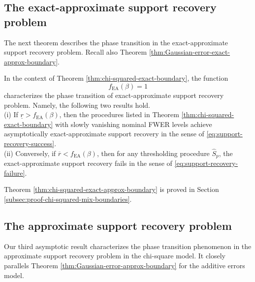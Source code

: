 \subsection{The exact-approximate support recovery problem}
\label{subsec:exact-approx-support-recovery-chisq}

The next theorem describes the phase transition in the exact-approximate support recovery problem. Recall also
Theorem \ref{thm:Gaussian-error-exact-approx-boundary}.

\begin{theorem} \label{thm:chi-squared-exact-approx-boundary}
In the context of Theorem \ref{thm:chi-squared-exact-boundary}, 
the function 
\begin{equation} \label{eq:exact-approx-boundary-chisquared}
    f_{\mathrm{EA}}(\beta) = 1
\end{equation}
characterizes the phase transition of exact-approximate support recovery problem.
 Namely, the following two results hold.\\

{\rm (i)} If $\underline{r} > f_{\mathrm{EA}}(\beta)$, then the procedures listed in Theorem \ref{thm:chi-squared-exact-boundary} with slowly 
vanishing nominal FWER levels achieve asymptotically exact-approximate support recovery in the sense of \eqref{eq:support-recovery-success}. \\

{\rm (ii)} Conversely, if $\overline{r} < f_{\mathrm{EA}}(\beta)$, then for any thresholding procedure $\widehat{S}_p$, the exact-approximate support recovery fails in the sense of \eqref{eq:support-recovery-failure}.
\end{theorem}

Theorem \ref{thm:chi-squared-exact-approx-boundary} is proved in Section \ref{subsec:proof-chi-squared-mix-boundaries}. 


\subsection{The approximate support recovery problem}
\label{subsec:approx-support-recovery-chisq}

Our third asymptotic result characterizes the phase transition phenomenon in the approximate support recovery problem in the chi-square model.
It closely parallels Theorem \ref{thm:Gaussian-error-approx-boundary} for the additive errors model.

